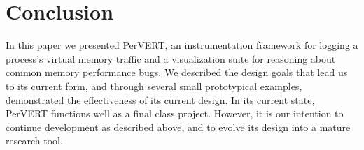 \documentclass[annual]{acmsiggraph}
\begin{document}
\section{Conclusion}

In this paper we presented PerVERT, an instrumentation framework for logging a process's virtual memory traffic and 
  a visualization suite for reasoning about common memory performance bugs.
We described the design goals that lead us to its current form,
  and through several small prototypical examples, demonstrated the effectiveness of its current design.
In its current state, PerVERT functions well as a final class project.
However, it is our intention to continue development as described above, and to evolve its design into a mature research tool.



\end{document}
